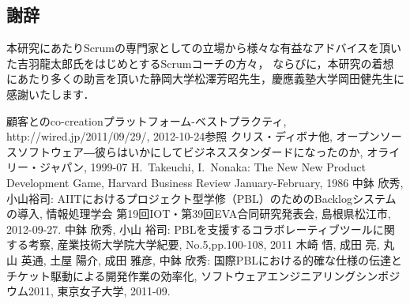 \documentclass[a4j,9pt,twoside]{jarticle}
\newcommand{\me}{中鉢 欣秀}
\begin{document}
\begin{multicols}{2}
\section*{謝辞}
    本研究にあたりScrumの専門家としての立場から様々な有益なアドバイスを頂いた吉羽龍太郎氏をはじめとするScrumコーチの方々，
    ならびに，本研究の着想にあたり多くの助言を頂いた静岡大学松澤芳昭先生，慶應義塾大学岡田健先生に感謝いたします．
	\vspace{\baselineskip}
	\begin{thebibliography}{99}
		 顧客とのco-creationプラットフォーム-ベストプラクティ, 
                        http://wired.jp/2011/09/29/,  2012-10-24参照
         クリス・ディボナ他, オープンソースソフトウェア―彼らはいかにしてビジネススタンダードになったのか,
        				オライリー・ジャパン, 1999-07
		 H.~Takeuchi, I.~Nonaka: The New New Product Development Game, Harvard Business Review January-February, 1986
		 \me, 小山裕司: AIITにおけるプロジェクト型学修（PBL）のためのBacklogシステムの導入, 情報処理学会 第19回IOT・第39回EVA合同研究発表会, 島根県松江市, 2012-09-27. 
		\me, 小山 裕司: PBLを支援するコラボレーティブツールに関する考察, 産業技術大学院大学紀要, No.5,pp.100-108, 2011 
		 木崎 悟, 成田 亮, 丸山 英通, 土屋 陽介, 成田 雅彦, \me: 国際PBLにおける的確な仕様の伝達とチケット駆動による開発作業の効率化, ソフトウェアエンジニアリングシンポジウム2011, 東京女子大学, 2011-09.

\end{thebibliography}
\end{multicols}
\end{document}
